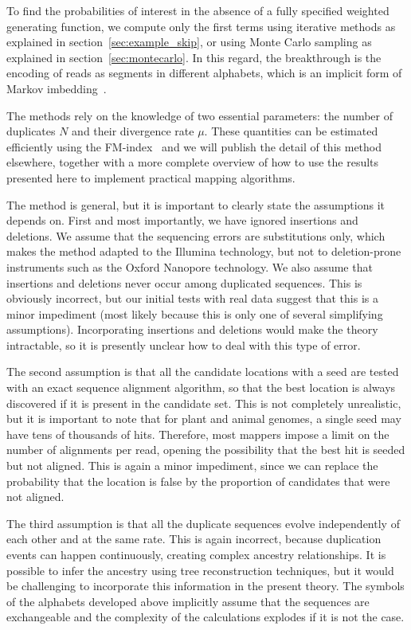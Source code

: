 \documentclass{article}
\begin{document}
To find the probabilities of interest in the absence of a fully specified
weighted generating function, we compute only the first terms using
iterative methods as explained in section~\ref{sec:example_skip}, or using
Monte Carlo sampling as explained in section~\ref{sec:montecarlo}. In this
regard, the breakthrough is the encoding of reads as segments in different
alphabets, which is an implicit form of Markov
imbedding~\cite{fu1994distribution}.

The methods rely on the knowledge of two essential parameters: the number
of duplicates $N$ and their divergence rate $\mu$. These quantities can be
estimated efficiently using the FM-index~\cite{ferragina2005indexing} and
we will publish the detail of this method elsewhere, together with a more
complete overview of how to use the results presented here to implement
practical mapping algorithms.

The method is general, but it is important to clearly state the
assumptions it depends on. First and most importantly, we have ignored
insertions and deletions. We assume that the sequencing errors are
substitutions only, which makes the method adapted to the Illumina
technology, but not to deletion-prone instruments such as the Oxford
Nanopore technology. We also assume that insertions and deletions never
occur among duplicated sequences. This is obviously incorrect, but our
initial tests with real data suggest that this is a minor impediment (most
likely because this is only one of several simplifying assumptions).
Incorporating insertions and deletions would make the theory intractable,
so it is presently unclear how to deal with this type of error.

The second assumption is that all the candidate locations with a seed are
tested with an exact sequence alignment algorithm, so that the best
location is always discovered if it is present in the candidate set. This
is not completely unrealistic, but it is important to note that for plant
and animal genomes, a single seed may have tens of thousands of hits.
Therefore, most mappers impose a limit on the number of alignments per
read, opening the possibility that the best hit is seeded but not aligned.
This is again a minor impediment, since we can replace the probability
that the location is false by the proportion of candidates that were not
aligned.

The third assumption is that all the duplicate sequences evolve
independently of each other and at the same rate. This is again incorrect,
because duplication events can happen continuously, creating complex
ancestry relationships. It is possible to infer the ancestry using tree
reconstruction techniques, but it would be challenging to incorporate this
information in the present theory. The symbols of the alphabets developed
above implicitly assume that the sequences are exchangeable and the
complexity of the calculations explodes if it is not the case.
\end{document}
